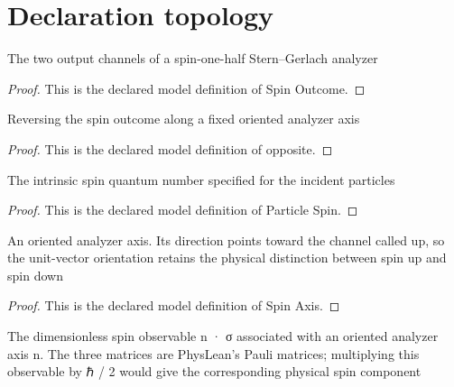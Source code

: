 \section{Declaration topology}
\begin{definition}
  \label{def:physics:phyx-mini-0542:phyxminiproblems-problemphyxmini0542-spinoutcome}
  The two output channels of a spin-one-half Stern–Gerlach analyzer
\end{definition}
\begin{proof}
  This is the declared model definition of Spin Outcome.
\end{proof}
\begin{definition}[opposite]
  \label{def:physics:phyx-mini-0542:phyxminiproblems-problemphyxmini0542-spinoutcome-opposite}
  Reversing the spin outcome along a fixed oriented analyzer axis
\end{definition}
\begin{proof}
  This is the declared model definition of opposite.
\end{proof}
\begin{definition}
  \label{def:physics:phyx-mini-0542:phyxminiproblems-problemphyxmini0542-particlespin}
  The intrinsic spin quantum number specified for the incident particles
\end{definition}
\begin{proof}
  This is the declared model definition of Particle Spin.
\end{proof}
\begin{definition}
  \label{def:physics:phyx-mini-0542:phyxminiproblems-problemphyxmini0542-spinaxis}
  An oriented analyzer axis. Its direction points toward the channel called up, so the unit-vector orientation retains the physical distinction between spin up and spin down
\end{definition}
\begin{proof}
  This is the declared model definition of Spin Axis.
\end{proof}
\begin{definition}
  \label{def:physics:phyx-mini-0542:phyxminiproblems-problemphyxmini0542-spinaxis-dimensionlesspauliobservable}
  The dimensionless spin observable n · σ associated with an oriented analyzer axis n. The three matrices are PhysLean's Pauli matrices; multiplying this observable by ℏ / 2 would give the corresponding physical spin component
\end{definition}
